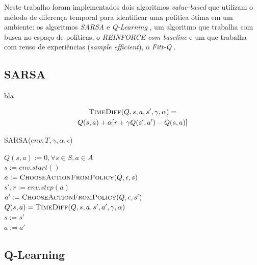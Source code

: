 \documentclass[letterpaper]{article}
\begin{document}
Neste trabalho foram implementados dois algoritmos \textit{value-based} que utilizam o método de diferença temporal para identificar uma política ótima em um ambiente: os algoritmos \textit{SARSA} e \textit{Q-Learning} \cite{Watkins-Dayan-1992}, um algoritmo que trabalha com busca no espaço de políticas, o \textit{REINFORCE com baseline} e um que trabalha com reuso de experiências (\textit{sample efficient}), o \textit{Fitt-Q} \cite{Riedmiller-2005}.

\subsection{SARSA}

bla

\begin{multline} \label{eq:time_diff_update_sarsa}
  \textsc{TimeDiff}(Q, s, a, s', \gamma, \alpha) = \\ 
      Q(s,a) + \alpha [r + \gamma Q(s', a') - Q(s,a)]
\end{multline}

\linesnumbered
\dontprintsemicolon
\begin{algorithm}[t!]
{
	\caption{\textsc{SARSA}($ env, T, \gamma, \alpha, \epsilon $)}
	\label{alg:sarsa}
    $Q(s,a) := 0, \forall s \in S, a \in A $\\

    {
      $s := env.start()$\\
      $a := \textsc{ChooseActionFromPolicy}(Q, \epsilon, s) $\\

      {
        $s', r := env.step(a)$\\
        $a' := \textsc{ChooseActionFromPolicy}(Q, \epsilon, s') $\\
        $Q(s, a) = \textsc{TimeDiff}(Q, s, a, s', a', \gamma, \alpha)$\\
        $s := s'$ \\
        $a := a'$ \\
      }
    }

}
\end{algorithm}

\subsection{Q-Learning}
\end{document}
